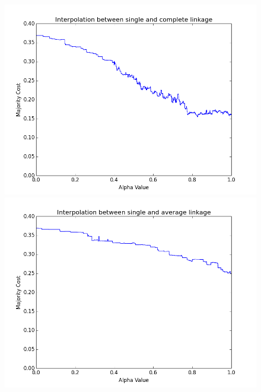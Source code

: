 \begin{figure}[h]
\centering
\begin{minipage}{.3\textwidth}
  \centering
  \includegraphics[width=\linewidth]{images/nell_sc}
\end{minipage}
\begin{minipage}{.3\textwidth}
  \centering
  \includegraphics[width=\linewidth]{images/nell_sa}
\end{minipage}
\begin{minipage}{.3\textwidth}
  \centering

\end{minipage}
\end{figure}
